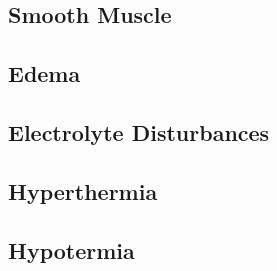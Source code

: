 \subsection{Smooth Muscle}

\subsection{Edema}

\subsection{Electrolyte Disturbances}

\subsection{Hyperthermia}

\subsection{Hypotermia}

\printbibliography[heading=subbibintoc]
